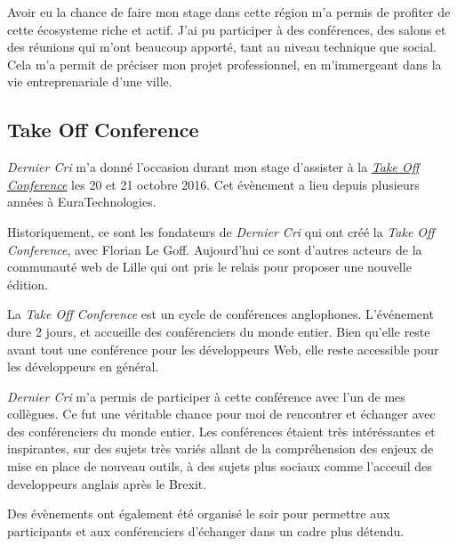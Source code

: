 \documentclass[12pt,a4paper]{article}
\begin{document}
  \bigskip

  Avoir eu la chance de faire mon stage dans cette région m'a permis de
  profiter de cette écosysteme riche et actif. J'ai pu participer à des
  conférences, des salons et des réunions qui m'ont beaucoup apporté, tant
  au niveau technique que social. Cela m'a permit de préciser mon projet
  professionnel, en m'immergeant dans la vie entreprenariale d'une ville.

  \bigskip

  \subsection{Take Off Conference}\label{take-off-conference}

  \bigskip

  \emph{Dernier Cri} m'a donné l'occasion durant mon stage d'assister à la
  \href{http://takeoffconf.com/2016}{\emph{Take Off Conference}} les 20 et
  21 octobre 2016. Cet évènement a lieu depuis plusieurs années à
  EuraTechnologies.

  \bigskip

  Historiquement, ce sont les fondateurs de \emph{Dernier Cri} qui ont
  créé la \emph{Take Off Conference}, avec Florian Le Goff. Aujourd'hui ce
  sont d'autres acteurs de la communauté web de Lille qui ont pris le
  relais pour proposer une nouvelle édition.

  \bigskip

  La \emph{Take Off Conference} est un cycle de conférences anglophones.
  L'événement dure 2 jours, et accueille des conférenciers du monde
  entier. Bien qu'elle reste avant tout une conférence pour les
  développeurs Web, elle reste accessible pour les développeurs en
  général.

  \bigskip

  \emph{Dernier Cri} m'a permis de participer à cette conférence avec l'un
  de mes collègues. Ce fut une véritable chance pour moi de rencontrer et
  échanger avec des conférenciers du monde entier. Les conférences étaient
  très intéréssantes et inspirantes, sur des sujets très variés allant de
  la compréhension des enjeux de mise en place de nouveau outils, à des
  sujets plus sociaux comme l'acceuil des developpeurs anglais après le
  Brexit.

  \bigskip

  Des évènements ont également été organisé le soir pour permettre aux
  participants et aux conférenciers d'échanger dans un cadre plus détendu.
\end{document}
